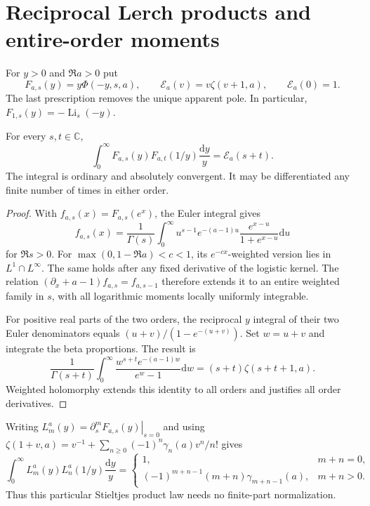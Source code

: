 \section{Reciprocal Lerch products and entire-order moments}
\label{rlc:insert:section}
For $y>0$ and $\Re a>0$ put
\[
 F_{a,s}(y)=y\Phi(-y,s,a),\qquad
 \mathcal E_a(v)=v\zeta(v+1,a),\qquad \mathcal E_a(0)=1.
\]
The last prescription removes the unique apparent pole. In particular,
$F_{1,s}(y)=-\operatorname{Li}_s(-y)$.
\begin{theorem}
\label{rlc:insert:product}
For every $s,t\in\mathbb C$,
\[
 \int_0^\infty F_{a,s}(y)F_{a,t}(1/y)\frac{\mathrm dy}{y}
        =\mathcal E_a(s+t).
\]
The integral is ordinary and absolutely convergent. It may be
differentiated any finite number of times in either order.
\end{theorem}
\begin{proof}
With $f_{a,s}(x)=F_{a,s}(e^x)$, the Euler integral gives
\[
 f_{a,s}(x)=\frac1{\Gamma(s)}\int_0^\infty
 u^{s-1}e^{-(a-1)u}\frac{e^{x-u}}{1+e^{x-u}}\mathrm du
\]
for $\Re s>0$. For
$\max(0,1-\Re a)<c<1$, its $e^{-cx}$-weighted version lies in
$L^1\cap L^\infty$. The same holds after any fixed derivative of the
logistic kernel. The relation
$(\partial_x+a-1)f_{a,s}=f_{a,s-1}$ therefore extends it to an entire
weighted family in $s$, with all logarithmic moments locally uniformly
integrable.

For positive real parts of the two orders, the reciprocal $y$ integral
of their two Euler denominators equals
$(u+v)/(1-e^{-(u+v)})$. Set $w=u+v$ and integrate the beta proportions.
The result is
\[
 \frac1{\Gamma(s+t)}\int_0^\infty
 \frac{w^{s+t}e^{-(a-1)w}}{e^w-1}\mathrm dw
       =(s+t)\zeta(s+t+1,a).
\]
Weighted holomorphy extends this identity to all orders and justifies
all order derivatives.
\end{proof}

Writing $L_m^a(y)=\left.\partial_s^mF_{a,s}(y)\right|_{s=0}$ and using
$\zeta(1+v,a)=v^{-1}+\sum_{n\ge0}(-1)^n\gamma_n(a)v^n/n!$ gives
\begin{equation}\label{rlc:insert:stieltjes}
 \int_0^\infty L_m^a(y)L_n^a(1/y)\frac{\mathrm dy}{y}
 =\begin{cases}
 1,&m+n=0,\\
 (-1)^{m+n-1}(m+n)\gamma_{m+n-1}(a),&m+n>0.
 \end{cases}
\end{equation}
Thus this particular Stieltjes product law needs no finite-part
normalization.

